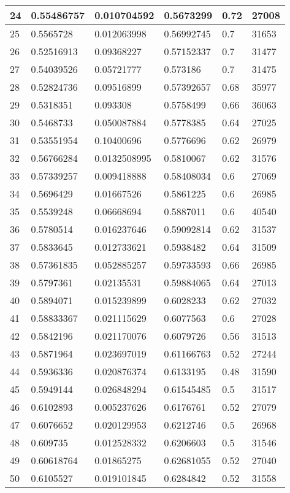\begin{longtable}{|l|l|l|l|l|l|}
24 & 0.55486757 & 0.010704592 & 0.5673299 & 0.72 & 27008 \\ \hline 
25 & 0.5565728 & 0.012063998 & 0.56992745 & 0.7 & 31653 \\ \hline 
26 & 0.52516913 & 0.09368227 & 0.57152337 & 0.7 & 31477 \\ \hline 
27 & 0.54039526 & 0.05721777 & 0.573186 & 0.7 & 31475 \\ \hline 
28 & 0.52824736 & 0.09516899 & 0.57392657 & 0.68 & 35977 \\ \hline 
29 & 0.5318351 & 0.093308 & 0.5758499 & 0.66 & 36063 \\ \hline 
30 & 0.5468733 & 0.050087884 & 0.5778385 & 0.64 & 27025 \\ \hline 
31 & 0.53551954 & 0.10400696 & 0.5776696 & 0.62 & 26979 \\ \hline 
32 & 0.56766284 & 0.0132508995 & 0.5810067 & 0.62 & 31576 \\ \hline 
33 & 0.57339257 & 0.009418888 & 0.58408034 & 0.6 & 27069 \\ \hline 
34 & 0.5696429 & 0.01667526 & 0.5861225 & 0.6 & 26985 \\ \hline 
35 & 0.5539248 & 0.06668694 & 0.5887011 & 0.6 & 40540 \\ \hline 
36 & 0.5780514 & 0.016237646 & 0.59092814 & 0.62 & 31537 \\ \hline 
37 & 0.5833645 & 0.012733621 & 0.5938482 & 0.64 & 31509 \\ \hline 
38 & 0.57361835 & 0.052885257 & 0.59733593 & 0.66 & 26985 \\ \hline 
39 & 0.5797361 & 0.02135531 & 0.59884065 & 0.64 & 27013 \\ \hline 
40 & 0.5894071 & 0.015239899 & 0.6028233 & 0.62 & 27032 \\ \hline 
41 & 0.58833367 & 0.021115629 & 0.6077563 & 0.6 & 27028 \\ \hline 
42 & 0.5842196 & 0.021170076 & 0.6079726 & 0.56 & 31513 \\ \hline 
43 & 0.5871964 & 0.023697019 & 0.61166763 & 0.52 & 27244 \\ \hline 
44 & 0.5936336 & 0.020876374 & 0.6133195 & 0.48 & 31590 \\ \hline 
45 & 0.5949144 & 0.026848294 & 0.61545485 & 0.5 & 31517 \\ \hline 
46 & 0.6102893 & 0.005237626 & 0.6176761 & 0.52 & 27079 \\ \hline 
47 & 0.6076652 & 0.020129953 & 0.6212746 & 0.5 & 26968 \\ \hline 
48 & 0.609735 & 0.012528332 & 0.6206603 & 0.5 & 31546 \\ \hline 
49 & 0.60618764 & 0.01865275 & 0.62681055 & 0.52 & 27040 \\ \hline 
50 & 0.6105527 & 0.019101845 & 0.6284842 & 0.52 & 31558 \\ \hline 
\end{longtable}